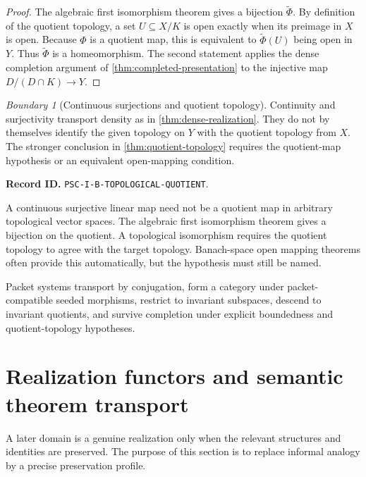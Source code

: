 \documentclass[11pt]{article}
\theoremstyle{definition}
\theoremstyle{remark}
\newtheorem{boundary}[boundary]{Boundary}
\newcommand{\RecordID}[1]{\par\smallskip\noindent\begingroup\footnotesize\color{PSCGray}\raggedright\textbf{Record ID.} \nolinkurl{#1}.\par\endgroup}
\begin{document}
\begin{proof}
The algebraic first isomorphism theorem gives a bijection $\widetilde\Phi$.  By definition of the quotient topology, a set $U\subseteq X/K$ is open exactly when its preimage in $X$ is open.  Because $\Phi$ is a quotient map, this is equivalent to $\widetilde\Phi(U)$ being open in $Y$.  Thus $\widetilde\Phi$ is a homeomorphism.  The second statement applies the dense completion argument of \cref{thm:completed-presentation} to the injective map $D/(D\cap K)\to Y$.
\end{proof}

\begin{boundary}[Continuous surjections and quotient topology]
\label{bnd:topological-quotient}
Continuity and surjectivity transport density as in \cref{thm:dense-realization}.  They do not by themselves identify the given topology on $Y$ with the quotient topology from $X$.  The stronger conclusion in \cref{thm:quotient-topology} requires the quotient-map hypothesis or an equivalent open-mapping condition.
\end{boundary}
\RecordID{PSC-I-B-TOPOLOGICAL-QUOTIENT}

\begin{warningbox}
A continuous surjective linear map need not be a quotient map in arbitrary topological vector spaces.  The algebraic first isomorphism theorem gives a bijection on the quotient.  A topological isomorphism requires the quotient topology to agree with the target topology.  Banach-space open mapping theorems often provide this automatically, but the hypothesis must still be named.
\end{warningbox}

\begin{sectionrecap}
Packet systems transport by conjugation, form a category under packet-compatible seeded morphisms, restrict to invariant subspaces, descend to invariant quotients, and survive completion under explicit boundedness and quotient-topology hypotheses.
\end{sectionrecap}


\section{Realization functors and semantic theorem transport}
\begin{readerroadmap}
A later domain is a genuine realization only when the relevant structures and identities are preserved.  The purpose of this section is to replace informal analogy by a precise preservation profile.
\end{readerroadmap}
\end{document}
